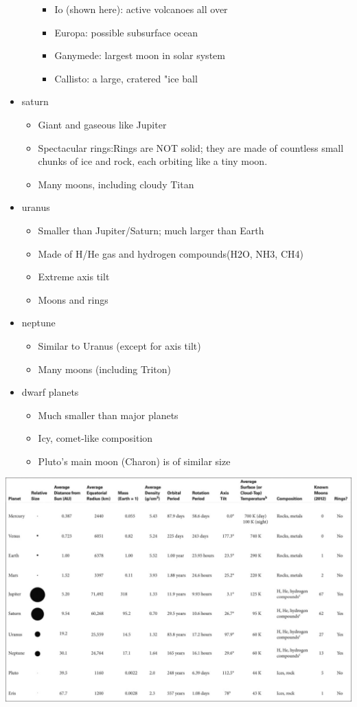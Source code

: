 \begin{itemize}
\begin{itemize}
\begin{itemize}
\item Io (shown here): active volcanoes all over
\item Europa: possible subsurface ocean
\item Ganymede: largest moon in solar system
\item Callisto: a large, cratered "ice ball
\end{itemize}
\end{itemize}
\item saturn
\begin{itemize}
\item Giant and gaseous like Jupiter
\item Spectacular rings:Rings are NOT solid; they are made of countless small chunks of ice and rock, each orbiting like a tiny moon.
\item Many moons, including cloudy Titan
\end{itemize}
\item uranus
\begin{itemize}
\item Smaller than Jupiter/Saturn; much larger than Earth
\item Made of H/He gas and hydrogen compounds(H2O, NH3, CH4)
\item Extreme axis tilt
\item Moons and rings
\end{itemize}
\item neptune
\begin{itemize}
\item Similar to Uranus (except for axis tilt)
\item Many moons (including Triton)
\end{itemize}
\item dwarf planets
\begin{itemize}
\item Much smaller than major planets
\item Icy, comet-like composition
\item Pluto's main moon (Charon) is of similar size
\end{itemize}
\end{itemize}
\includegraphics[angle=90,scale=0.5]{planetData}

